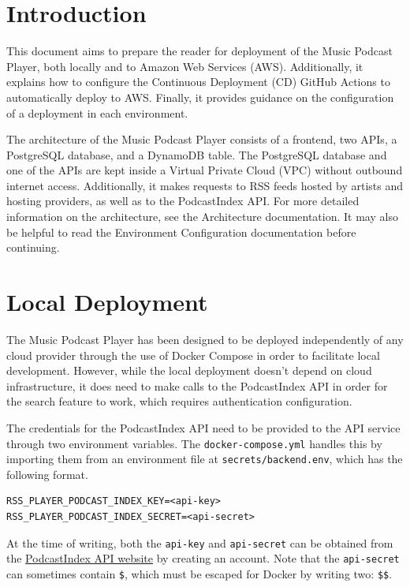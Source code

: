 \documentclass{article}
\begin{document}
\section{Introduction}

This document aims to prepare the reader for deployment of the Music Podcast Player, both
locally and to Amazon Web Services (AWS). Additionally, it explains how to configure the
Continuous Deployment (CD) GitHub Actions to automatically deploy to AWS. Finally, it 
provides guidance on the configuration of a deployment in each environment.

The architecture of the Music Podcast Player consists of a frontend, two APIs, a
PostgreSQL database, and a DynamoDB table. The PostgreSQL database and one of the APIs 
are kept inside a Virtual Private Cloud (VPC) without outbound internet access. 
Additionally, it makes requests to RSS feeds hosted by artists and hosting providers, as 
well as to the PodcastIndex API. For more detailed information on the architecture, see 
the Architecture documentation. It may also be helpful to read the Environment 
Configuration documentation before continuing.

\section{Local Deployment}

The Music Podcast Player has been designed to be deployed independently of any cloud
provider through the use of Docker Compose in order to facilitate local development.
However, while the local deployment doesn't depend on cloud infrastructure, it does need 
to make calls to the PodcastIndex API in order for the search feature to work, which 
requires authentication configuration.

The credentials for the PodcastIndex API need to be provided to the API service through
two environment variables. The \verb|docker-compose.yml| handles this by importing them 
from an environment file at \verb|secrets/backend.env|, which has the following format.

\begin{verbatim}
RSS_PLAYER_PODCAST_INDEX_KEY=<api-key>
RSS_PLAYER_PODCAST_INDEX_SECRET=<api-secret>
\end{verbatim}

At the time of writing, both the \verb|api-key| and \verb|api-secret| can be obtained 
from the \href{https://api.podcastindex.org/}{PodcastIndex API website} by creating an 
account. Note that the \verb|api-secret| can sometimes contain \verb|$|, which must be
escaped for Docker by writing two: \verb|$$|.
\end{document}
